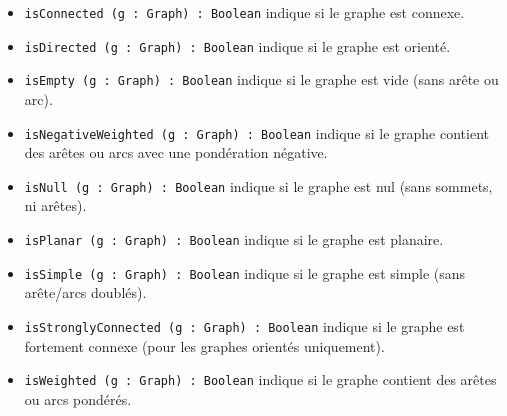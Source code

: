 \documentclass[french]{article}
\begin{document}
\begin{itemize}
			\item \texttt{isConnected (g : Graph) : Boolean} indique si le graphe est connexe.
			\item \texttt{isDirected (g : Graph) : Boolean} indique si le graphe est orienté.
			\item \texttt{isEmpty (g : Graph) : Boolean} indique si le graphe est vide (sans arête ou arc).
			\item \texttt{isNegativeWeighted (g : Graph) : Boolean} indique si le graphe contient des arêtes ou arcs avec une pondération négative.
			\item \texttt{isNull (g : Graph) : Boolean} indique si le graphe est nul (sans sommets, ni arêtes).
			\item \texttt{isPlanar (g : Graph) : Boolean} indique si le graphe est planaire.
			\item \texttt{isSimple (g : Graph) : Boolean} indique si le graphe est simple (sans arête/arcs doublés).
			\item \texttt{isStronglyConnected (g : Graph) : Boolean} indique si le graphe est fortement connexe (pour les graphes orientés uniquement).
			\item \texttt{isWeighted (g : Graph) : Boolean} indique si le graphe contient des arêtes ou arcs pondérés.
			
		\end{itemize}
		
\end{document}
